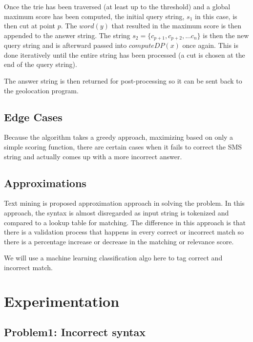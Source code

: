 \documentclass{acm_proc_article-sp}
\begin{document}
Once the trie has been traversed (at least up to the threshold) and a global maximum score has been computed, the initial query string, $s_1$ in this case, is then cut at point $p$. The $word(y)$ that resulted in the maximum score is then appended to the answer string. The string $s_2 = \{c_{p+1}, c_{p+2}, ... c_n\}$ is then the new query string and is afterward passed into $computeDP(x)$ once again. This is done iteratively until the entire string has been processed (a cut is chosen at the end of the query string). 

The answer string is then returned for post-processing so it can be sent back to the geolocation program. 



\subsection{Edge Cases} 
Because the algorithm takes a greedy approach, maximizing based on only a simple scoring function, there are certain cases when it fails to correct the SMS string and actually comes up with a more incorrect answer. 

\subsection{Approximations}
Text mining is proposed approximation approach in solving the problem. In this approach, the syntax is almost disregarded as input string is tokenized and compared to a lookup table for matching. The difference in this approach is that there is a validation process that happens in every correct or incorrect match so there is a percentage increase or decrease in the matching or relevance score. 

We will use a machine learning classification algo here to tag correct and incorrect match.

\section{Experimentation}
\subsection{Problem1: Incorrect syntax}
\end{document}
